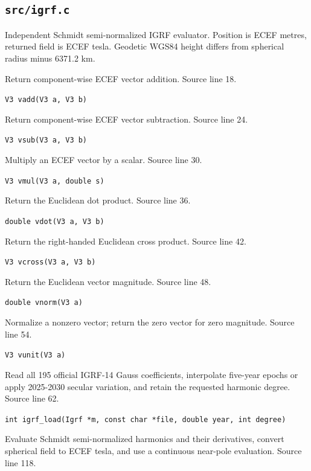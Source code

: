 \subsection{\texttt{src/igrf.c}}
Independent Schmidt semi-normalized IGRF evaluator. Position is ECEF metres, returned field is ECEF tesla. Geodetic WGS84 height differs from spherical radius minus 6371.2 km.
\begin{description}[style=nextline,leftmargin=0pt,labelindent=0pt,labelwidth=0pt,labelsep=0pt]
\item[\texttt{vadd}] Return component-wise ECEF vector addition. Source line 18.\par
{\small\nolinkurl{V3 vadd(V3 a, V3 b)}}
\item[\texttt{vsub}] Return component-wise ECEF vector subtraction. Source line 24.\par
{\small\nolinkurl{V3 vsub(V3 a, V3 b)}}
\item[\texttt{vmul}] Multiply an ECEF vector by a scalar. Source line 30.\par
{\small\nolinkurl{V3 vmul(V3 a, double s)}}
\item[\texttt{vdot}] Return the Euclidean dot product. Source line 36.\par
{\small\nolinkurl{double vdot(V3 a, V3 b)}}
\item[\texttt{vcross}] Return the right-handed Euclidean cross product. Source line 42.\par
{\small\nolinkurl{V3 vcross(V3 a, V3 b)}}
\item[\texttt{vnorm}] Return the Euclidean vector magnitude. Source line 48.\par
{\small\nolinkurl{double vnorm(V3 a)}}
\item[\texttt{vunit}] Normalize a nonzero vector; return the zero vector for zero magnitude. Source line 54.\par
{\small\nolinkurl{V3 vunit(V3 a)}}
\item[\texttt{igrf\_load}] Read all 195 official IGRF-14 Gauss coefficients, interpolate five-year epochs or apply 2025-2030 secular variation, and retain the requested harmonic degree. Source line 62.\par
{\small\nolinkurl{int igrf_load(Igrf *m, const char *file, double year, int degree)}}
\item[\texttt{igrf\_field}] Evaluate Schmidt semi-normalized harmonics and their derivatives, convert spherical field to ECEF tesla, and use a continuous near-pole evaluation. Source line 118.\par

\end{description}
